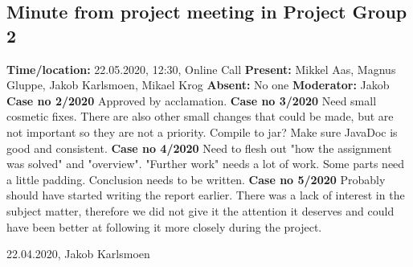 \documentclass{article}
\begin{document}
\subsection{Minute from project meeting in Project Group 2}
\newline
\textbf{Time/location:} 22.05.2020, 12:30, Online Call
\newline
\textbf{Present: }Mikkel Aas, Magnus Gluppe, Jakob Karlsmoen, Mikael Krog
\newline
\textbf{Absent:} No one
\newline
\textbf{Moderator:} Jakob
\newline \newline
\textbf{Case no 2/2020} \newline
Approved by acclamation.
\newline  \newline
\textbf{Case no 3/2020}  \newline
Need small cosmetic fixes. There are also other small changes that could be made, but are not important so they are not a priority. Compile to jar? Make sure JavaDoc is good and consistent. 
\newline  \newline
\textbf{Case no 4/2020}  \newline
Need to flesh out "how the assignment was solved" and "overview". "Further work" needs a lot of work. Some parts need a little padding. Conclusion needs to be written. 
\newline  \newline
\textbf{Case no 5/2020}  \newline
Probably should have started writing the report earlier. There was a lack of interest in the subject matter, therefore we did not give it the attention it deserves and could have been better at following it more closely during the project. 
\begin{flushright} 22.04.2020, Jakob Karlsmoen\end{flushright}
\end{document}

